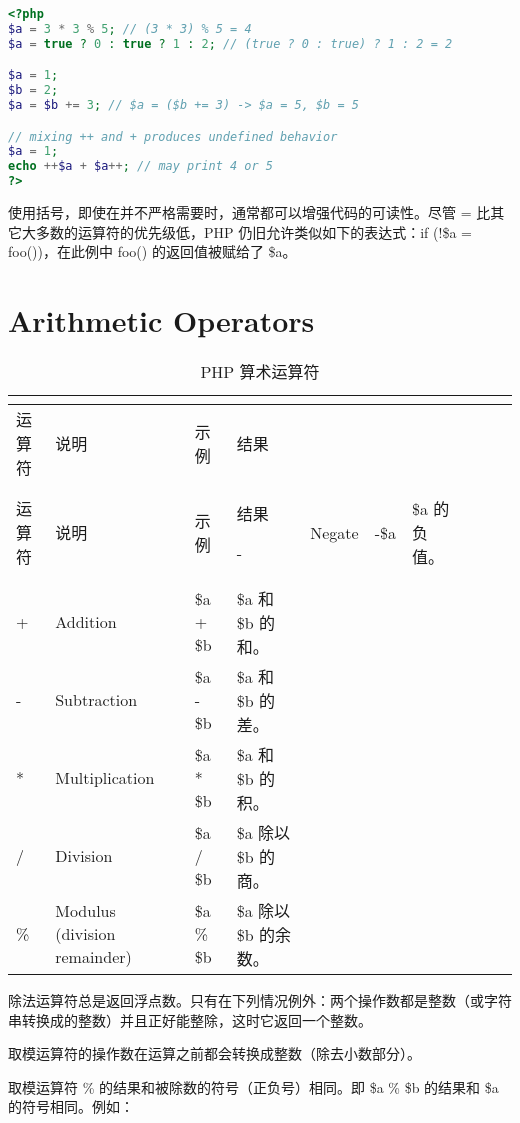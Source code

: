 \begin{lstlisting}[language=PHP]
<?php
$a = 3 * 3 % 5; // (3 * 3) % 5 = 4
$a = true ? 0 : true ? 1 : 2; // (true ? 0 : true) ? 1 : 2 = 2

$a = 1;
$b = 2;
$a = $b += 3; // $a = ($b += 3) -> $a = 5, $b = 5

// mixing ++ and + produces undefined behavior
$a = 1;
echo ++$a + $a++; // may print 4 or 5
?>
\end{lstlisting}

使用括号，即使在并不严格需要时，通常都可以增强代码的可读性。尽管 = 比其它大多数的运算符的优先级低，PHP 仍旧允许类似如下的表达式：if (!\$a = foo())，在此例中 foo() 的返回值被赋给了 \$a。

\section{Arithmetic Operators}

\begin{longtable}{|m{35pt}|m{130pt}|m{50pt}|m{150pt}|}
\tabularnewline\hline
运算符	&说明	&示例	&结果
\endhead

\caption{PHP 算术运算符}\\
\hline
运算符	&说明	&示例	&结果
\endfirsthead

\endfoot

\endlastfoot
\hline
- &Negate		&-\$a					&\$a 的负值。\\
\hline
+	&Addition		&\$a + \$b		&\$a 和 \$b 的和。\\
\hline
-	&Subtraction	&\$a - \$b		&\$a 和 \$b 的差。\\
\hline
*	&Multiplication	&\$a * \$b		&\$a 和 \$b 的积。\\
\hline
/	&Division		&\$a / \$b		&\$a 除以\$b 的商。\\
\hline
\%	&Modulus (division remainder)	&\$a \% \$b &\$a 除以 \$b 的余数。\\
\hline


\end{longtable}

除法运算符总是返回浮点数。只有在下列情况例外：两个操作数都是整数（或字符串转换成的整数）并且正好能整除，这时它返回一个整数。

取模运算符的操作数在运算之前都会转换成整数（除去小数部分）。

取模运算符 \% 的结果和被除数的符号（正负号）相同。即 \$a \% \$b 的结果和 \$a 的符号相同。例如：


